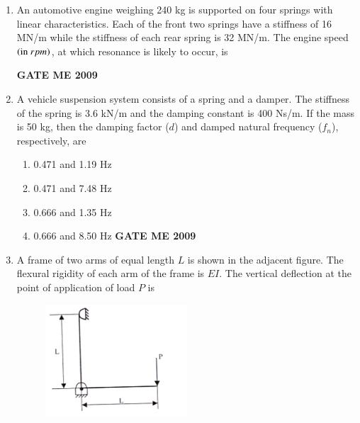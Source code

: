 \documentclass[journal]{IEEEtran}
\begin{document}
\begin{enumerate}[leftmargin=0pt]
\item An automotive engine weighing 240 kg is supported on four springs with linear characteristics. Each of the front two springs have a stiffness of 16 MN/m while the stiffness of each rear spring is 32 MN/m. The engine speed $\left(\text{in}\  rpm\right)$, at which resonance is likely to occur, is
\begin{enumerate}
\hfill{\textbf{GATE ME 2009}}
\end{enumerate}

\item A vehicle suspension system consists of a spring and a damper. The stiffness of the spring is 3.6 kN/m and the damping constant is 400 Ns/m. If the mass is 50 kg, then the damping factor ($d$) and damped natural frequency ($f_n$), respectively, are
\begin{enumerate}
  \item 0.471 and 1.19 Hz
  \item 0.471 and 7.48 Hz
  \item 0.666 and 1.35 Hz
  \item 0.666 and 8.50 Hz
\hfill{\textbf{GATE ME 2009}}
\end{enumerate}

\item A frame of two arms of equal length $L$ is shown in the adjacent figure. The flexural rigidity of each arm of the frame is $EI$. The vertical deflection at the point of application of load $P$ is
\begin{figure}[h]
  \centering
  \includegraphics[width=0.5\textwidth]{Figs/image (9).png}
  \caption{}
\end{figure}


\end{enumerate}
\end{document}
